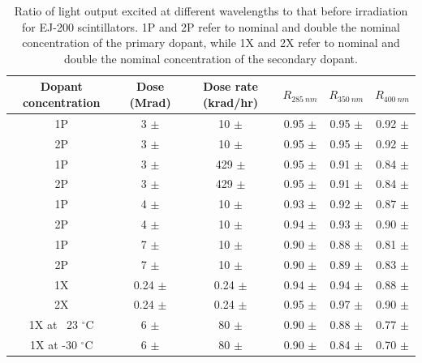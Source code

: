 \documentclass[preprint,12pt]{elsarticle}
\begin{document}
\begin{table}[!ht]
\centering
  \caption{Ratio of light output excited at different wavelengths to that before irradiation for EJ-200 scintillators. 
1P and 2P refer to nominal and double the nominal concentration of the primary dopant, 
while 1X and 2X refer to nominal and double the nominal concentration of the secondary dopant.}	
  \begin{tabular}{c|c|c|c|c|c}
    \hline
    Dopant concentration & Dose (Mrad) 	& Dose rate (krad/hr)    &$R_{285~nm}$	&$R_{350~nm}$	&$R_{400~nm}$	\\ \hline
    1P     	    	 & 3 $\pm$  	& 10 $\pm$  	   	 &0.95 $\pm$	&0.95 ${\pm}$	&0.92 ${\pm}$	\\ 
    2P     	    	 & 3 $\pm$  	& 10 $\pm$  	   	 &0.95 ${\pm}$	&0.95 ${\pm}$	&0.92 ${\pm}$	\\ \hline
    1P			 & 3 $\pm$	& 429 $\pm$		 &0.95 ${\pm}$	&0.91 ${\pm}$	&0.84 ${\pm}$	\\ 
    2P			 & 3 $\pm$	& 429 $\pm$		 &0.95 ${\pm}$	&0.91 ${\pm}$	&0.84 ${\pm}$	\\ \hline
    1P     	    	 & 4 $\pm$  	& 10 $\pm$  	   	 &0.93 ${\pm}$	&0.92 ${\pm}$	&0.87 ${\pm}$	\\ 
    2P     	    	 & 4 $\pm$  	& 10 $\pm$  	   	 &0.94 ${\pm}$	&0.93 ${\pm}$	&0.90 ${\pm}$	\\ \hline
    1P			 & 7 $\pm$	& 10 $\pm$		 &0.90 ${\pm}$	&0.88 ${\pm}$	&0.81 ${\pm}$	\\ 
    2P			 & 7 $\pm$	& 10 $\pm$		 &0.90 ${\pm}$	&0.89 ${\pm}$	&0.83 ${\pm}$	\\ \hline
    1X     	    	 & 0.24 $\pm$  	& 0.24 $\pm$  	   	 &0.94 ${\pm}$	&0.94 ${\pm}$	&0.88 ${\pm}$	\\ 
    2X     	    	 & 0.24 $\pm$  	& 0.24 $\pm$  	   	 &0.95 ${\pm}$	&0.97 ${\pm}$	&0.90 ${\pm}$	\\ \hline
    1X at ~23 $^\circ$C	 & 6 $\pm$	& 80 $\pm$		 &0.90 ${\pm}$	&0.88 ${\pm}$	&0.77 ${\pm}$	\\ 
    1X at -30 $^\circ$C	 & 6 $\pm$	& 80 $\pm$		 &0.90 ${\pm}$	&0.84 ${\pm}$	&0.70 ${\pm}$	\\
    \hline
  \end{tabular}
  \label{table:light-yield-ratio}
\end{table}
\end{document}
